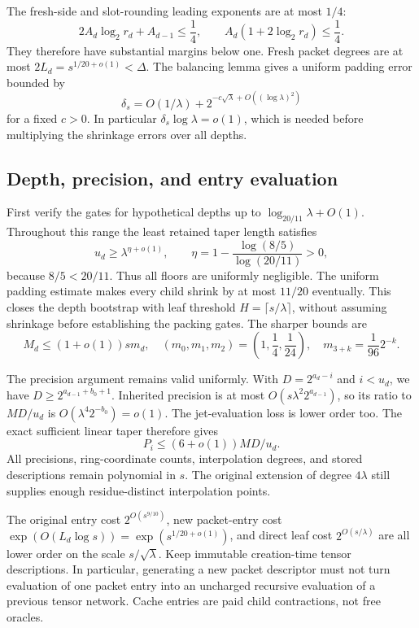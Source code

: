 The fresh-side and slot-rounding leading exponents are at most $1/4$:
\[
 2A_d\log_2r_d+A_{d-1}\le\frac14,
 \qquad A_d(1+2\log_2r_d)\le\frac14.
\]
They therefore have substantial margins below one. Fresh packet degrees
are at most $2L_d=s^{1/20+o(1)}<\Delta$. The balancing lemma gives a
uniform padding error bounded by
\[
 \delta_s=O(1/\lambda)+2^{-c\sqrt\lambda+O((\log\lambda)^2)}
\]
for a fixed $c>0$. In particular $\delta_s\log\lambda=o(1)$,
which is needed before multiplying the shrinkage errors over all depths.

\subsection{Depth, precision, and entry evaluation}

First verify the gates for hypothetical depths up to
$\log_{20/11}\lambda+O(1)$. Throughout this range the least retained
taper length satisfies
\[
 u_d\ge\lambda^{\eta+o(1)},\qquad
 \eta=1-\frac{\log(8/5)}{\log(20/11)}>0,
\]
because $8/5<20/11$. Thus all floors are uniformly negligible.
The uniform padding estimate makes every child shrink by at most $11/20$
eventually. This closes the depth bootstrap with leaf threshold
$H=\lceil s/\lambda\rceil$, without assuming shrinkage before establishing
the packing gates. The sharper bounds are
\[
 M_d\le(1+o(1))s m_d,
 \quad (m_0,m_1,m_2)=\left(1,\frac14,\frac1{24}\right),
 \quad m_{3+k}=\frac1{96}2^{-k}.
\]

The precision argument remains valid uniformly. With
$D=2^{a_d-i}$ and $i<u_d$, we have
$D\ge2^{a_{d-1}+b_0+1}$. Inherited precision is at most
$O(s\lambda^2 2^{a_{d-1}})$, so its ratio to $MD/u_d$ is
$O(\lambda^4 2^{-b_0})=o(1)$. The jet-evaluation loss is lower order too.
The exact sufficient linear taper therefore gives
\[
 P_i\le(6+o(1))MD/u_d.
\]
All precisions, ring-coordinate counts, interpolation degrees, and stored
descriptions remain polynomial in $s$. The original extension of degree
$4\lambda$ still supplies enough residue-distinct interpolation points.

The original entry cost $2^{O(s^{9/10})}$, new packet-entry cost
$\exp(O(L_d\log s))=\exp(s^{1/20+o(1)})$, and direct leaf cost
$2^{O(s/\lambda)}$ are all lower order on the scale $s/\sqrt\lambda$.
Keep immutable creation-time tensor descriptions. In particular, generating
a new packet descriptor must not turn evaluation of one packet entry into
an uncharged recursive evaluation of a previous tensor network.
Cache entries are paid child contractions, not free oracles.

